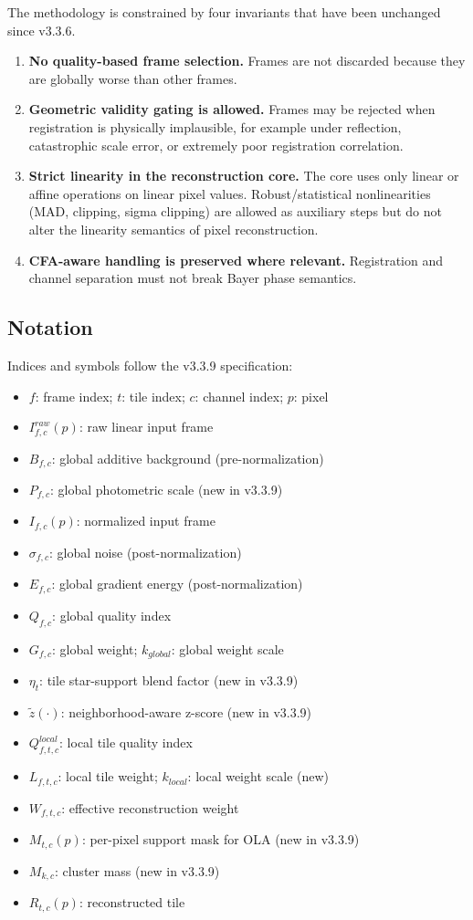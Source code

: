\documentclass[10pt,twocolumn]{article}
\begin{document}
The methodology is constrained by four invariants that have been unchanged since v3.3.6.
\begin{enumerate}
  \item \textbf{No quality-based frame selection.} Frames are not discarded because they are
        globally worse than other frames.
  \item \textbf{Geometric validity gating is allowed.} Frames may be rejected when registration
        is physically implausible, for example under reflection, catastrophic scale error, or
        extremely poor registration correlation.
  \item \textbf{Strict linearity in the reconstruction core.} The core uses only linear or
        affine operations on linear pixel values. Robust/statistical nonlinearities (MAD,
        clipping, sigma clipping) are allowed as auxiliary steps but do not alter the linearity
        semantics of pixel reconstruction.
  \item \textbf{CFA-aware handling is preserved where relevant.} Registration and channel
        separation must not break Bayer phase semantics.
\end{enumerate}

\subsection{Notation}

Indices and symbols follow the v3.3.9 specification:
\begin{itemize}
  \item $f$: frame index; $t$: tile index; $c$: channel index; $p$: pixel
  \item $I_{f,c}^{raw}(p)$: raw linear input frame
  \item $B_{f,c}$: global additive background (pre-normalization)
  \item $P_{f,c}$: global photometric scale (new in v3.3.9)
  \item $I_{f,c}(p)$: normalized input frame
  \item $\sigma_{f,c}$: global noise (post-normalization)
  \item $E_{f,c}$: global gradient energy (post-normalization)
  \item $Q_{f,c}$: global quality index
  \item $G_{f,c}$: global weight; $k_{global}$: global weight scale
  \item $\eta_t$: tile star-support blend factor (new in v3.3.9)
  \item $\tilde{z}(\cdot)$: neighborhood-aware z-score (new in v3.3.9)
  \item $Q_{f,t,c}^{local}$: local tile quality index
  \item $L_{f,t,c}$: local tile weight; $k_{local}$: local weight scale (new)
  \item $W_{f,t,c}$: effective reconstruction weight
  \item $M_{t,c}(p)$: per-pixel support mask for OLA (new in v3.3.9)
  \item $M_{k,c}$: cluster mass (new in v3.3.9)
  \item $R_{t,c}(p)$: reconstructed tile
\end{itemize}
\end{document}
